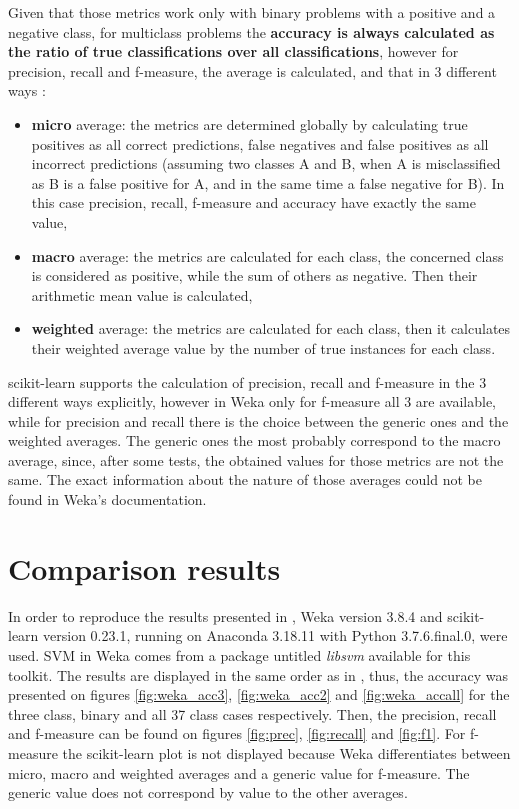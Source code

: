 Given that those metrics work only with binary problems with a positive and a negative class, for multiclass problems the \textbf{accuracy is always calculated as the ratio of true classifications over all classifications}, however for precision, recall and f-measure, the average is calculated, and that in 3 different ways \cite{shmueli_multi-class_2020}:

\begin{itemize}
    \item \textbf{micro} average: the metrics are determined globally by calculating true positives as all correct predictions, false negatives and false positives as all incorrect predictions (assuming two classes A and B, when A is misclassified as B is a false positive for A, and in the same time a false negative for B). In this case precision, recall, f-measure and accuracy have exactly the same value,
    \item \textbf{macro} average: the metrics are calculated for each class, the concerned class is considered as positive, while the sum of others as negative. Then their arithmetic mean value is calculated,
    \item \textbf{weighted} average: the metrics are calculated for each class, then it calculates their weighted average value by the number of true instances for each class.
\end{itemize}

scikit-learn supports the calculation of precision, recall and f-measure in the 3 different ways explicitly, however in Weka only for f-measure all 3 are available, while for precision and recall there is the choice between the generic ones and the weighted averages. The generic ones the most probably correspond to the macro average, since, after some tests, the obtained values for those metrics are not the same. The exact information about the nature of those averages could not be found in Weka's documentation.

\section{Comparison results}
In order to reproduce the results presented in \cite{borges_hink_machine_2014-1}, Weka version 3.8.4 and scikit-learn version 0.23.1, running on Anaconda 3.18.11 with Python 3.7.6.final.0, were used. SVM in Weka comes from a package untitled \textit{libsvm} available for this toolkit. The results are displayed in the same order as in \cite{borges_hink_machine_2014-1}, thus, the accuracy was presented on figures \ref{fig:weka_acc3}, \ref{fig:weka_acc2} and \ref{fig:weka_accall} for the three class, binary and all 37 class cases respectively. Then, the precision, recall and f-measure can be found on figures \ref{fig:prec}, \ref{fig:recall} and \ref{fig:f1}. For f-measure the scikit-learn plot is not displayed because Weka differentiates between micro, macro and weighted averages and a generic value for f-measure. The generic value does not correspond by value to the other averages.  

